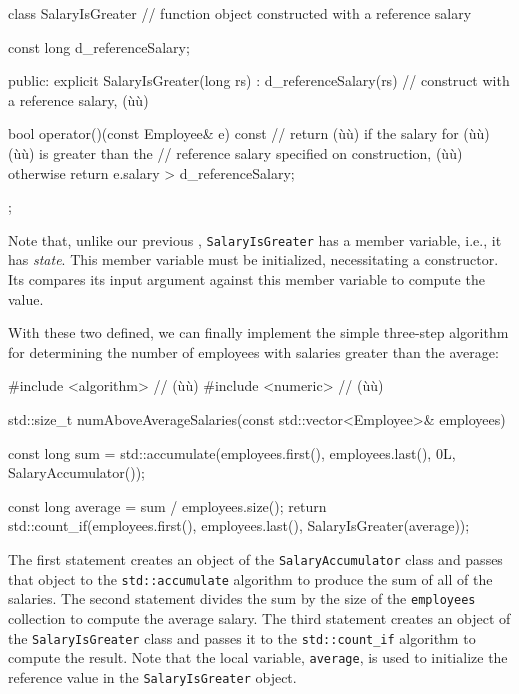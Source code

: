 \begin{emcppslisting}
class SalaryIsGreater  // function object constructed with a reference salary
{
    const long d_referenceSalary;

public:
    explicit SalaryIsGreater(long rs) : d_referenceSalary(rs) { }
        // construct with a reference salary, (ù{}ù)

    bool operator()(const Employee& e) const
        // return (ù{}ù) if the salary for (ù{}ù) (ù{}ù) is greater than the
        // reference salary specified on construction, (ù{}ù) otherwise
    {
        return e.salary > d_referenceSalary;
    }
};
\end{emcppslisting}
    

Note that, unlike our previous ,
\lstinline!SalaryIsGreater! has a member variable, i.e., it has
\emph{state}. This member variable must be initialized, necessitating a
constructor. Its  compares its input argument
against this member variable to compute the  value.

With these two  defined, we can finally
implement the simple three-step algorithm for determining the number of
employees with salaries greater than the average:

\begin{emcppslisting}
#include <algorithm>  // (ù{}ù)
#include <numeric>    // (ù{}ù)

std::size_t numAboveAverageSalaries(const std::vector<Employee>& employees)
{
    const long sum = std::accumulate(employees.first(), employees.last(), 0L,
                                     SalaryAccumulator());

    const long average = sum / employees.size();
    return std::count_if(employees.first(), employees.last(),
                         SalaryIsGreater(average));
}
\end{emcppslisting}
    

The first statement creates an object of the \lstinline!SalaryAccumulator!
class and passes that object to the \lstinline!std::accumulate! algorithm
to produce the sum of all of the salaries. The second statement divides
the sum by the size of the \lstinline!employees! collection to compute the
average salary. The third statement creates an object of the
\lstinline!SalaryIsGreater! class and passes it to the
\lstinline!std::count_if! algorithm to compute the result. Note that the
local variable, \lstinline!average!, is used to initialize the reference
value in the \lstinline!SalaryIsGreater! object.

